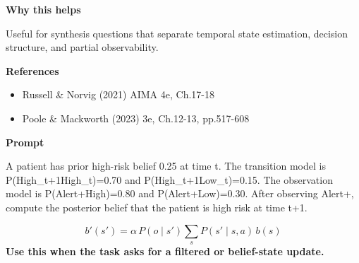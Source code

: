 \documentclass[11pt]{article}
\begin{document}
\begin{tcolorbox}[colback=white,colframe=MidnightBlue,title={Q1 Core Concept Check},fonttitle=\bfseries,breakable]
{\large\bfseries\color{MidnightBlue} Why this helps}\par\medskip
Useful for synthesis questions that separate temporal state estimation, decision structure, and partial observability.

{\large\bfseries\color{MidnightBlue} References}\par\medskip
\begin{itemize}\item Russell \& Norvig (2021) AIMA 4e, Ch.17-18
\item Poole \& Mackworth (2023) 3e, Ch.12-13, pp.517-608\end{itemize}
\end{tcolorbox}

\begin{tcolorbox}[colback=white,colframe=MidnightBlue,title={Q2 Structured Problem},fonttitle=\bfseries,breakable]
\begin{center}
\end{center}

{\large\bfseries\color{MidnightBlue} Prompt}\par\medskip
A patient has prior high-risk belief 0.25 at time t. The transition model is P(High\_t+1\textbar High\_t)=0.70 and P(High\_t+1\textbar Low\_t)=0.15. The observation model is P(Alert+\textbar High)=0.80 and P(Alert+\textbar Low)=0.30. After observing Alert+, compute the posterior belief that the patient is high risk at time t+1.

\begin{tcolorbox}[colback=ForestGreen!5,colframe=ForestGreen,title={Formula reminder},fonttitle=\bfseries,breakable]
\[
b'(s')=\alpha \, P(o \mid s') \sum_{s} P(s' \mid s,a)\,b(s)
\]
\textbf{Use this when the task asks for a filtered or belief-state update.}
\end{tcolorbox}


\end{tcolorbox}
\end{document}
